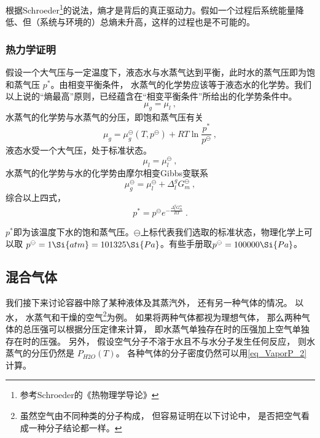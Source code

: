 根据Schroeder\footnote{参考Schroeder的《热物理学导论》}的说法，熵才是背后的真正驱动力。假如一个过程后系统能量降低、但（系统与环境的）总熵未升高，这样的过程也是不可能的。

\subsubsection{热力学证明}
假设一个大气压与一定温度下，液态水与水蒸气达到平衡，此时水的蒸气压即为饱和蒸气压 $p^*$。由相变平衡条件， 水蒸气的化学势应该等于液态水的化学势。我们以上说的“熵最高”原则，已经蕴含在“相变平衡条件”所给出的化学势条件中。
$$
\mu_g = \mu_l~,
$$
水蒸气的化学势与水蒸气的分压，即饱和蒸气压有关
$$
\mu_g= \mu_g^\ominus(T,p^\ominus) + RT \ln \frac{p^*}{p^\ominus}~,
$$
液态水受一个大气压，处于标准状态。
$$
\mu_l = \mu_l^\ominus~,
$$
水蒸气的化学势与水的化学势由摩尔相变Gibbs变联系 
$$
\mu_g^\ominus = \mu_l^\ominus + \Delta_l^g G_m^\ominus~,
$$
综合以上四式，
$$p^* = p^\ominus e^{-\frac{\Delta_l^g G_m^\ominus}{RT}}~.$$

$p^*$即为该温度下水的饱和蒸气压。$\ominus$上标代表我们选取的标准状态，物理化学上可以取 $p^\ominus = 1 \Si{atm} = 101325 \Si{Pa}$。有些手册取$p^\ominus = 100000 \Si{Pa}$。





\subsection{混合气体}

我们接下来讨论容器中除了某种液体及其蒸汽外， 还有另一种气体的情况。 以水， 水蒸气和干燥的空气\footnote{虽然空气由不同种类的分子构成， 但容易证明在以下讨论中， 是否把空气看成一种分子结论都一样。}为例。 如果将两种气体都视为理想气体， 那么两种气体的总压强可以根据分压定律来计算， 即水蒸气单独存在时的压强加上空气单独存在时的压强。 另外， 假设空气分子不溶于水且不与水分子发生任何反应， 则水蒸气的分压仍然是 $P_{H2O}(T)$。 各种气体的分子密度仍然可以用\autoref{eq_VaporP_2} 计算。

